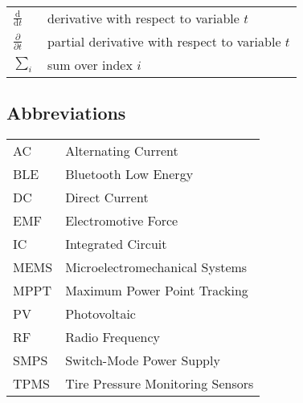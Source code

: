 \documentclass[english,12pt,a4paper,pdftex,elec,utf8]{aaltothesis}
\begin{document}
\begin{tabular}{ll}
$\displaystyle\frac{\mbox{d}}{\mbox{d} t}$ & derivative with respect to 
variable $t$\\[3mm]
$\displaystyle\frac{\partial}{\partial t}$  & partial derivative with respect 
to variable $t$ \\[3mm]
$\sum_i $                       & sum over index $i$
\end{tabular}

\subsection*{Abbreviations}

\begin{tabular}{ll}
AC         & Alternating Current \\
BLE        & Bluetooth Low Energy \\
DC         & Direct Current \\
EMF        & Electromotive Force \\
IC         & Integrated Circuit \\
MEMS       & Microelectromechanical Systems \\
MPPT       & Maximum Power Point Tracking \\
PV         & Photovoltaic \\
RF         & Radio Frequency \\
SMPS       & Switch-Mode Power Supply \\
TPMS       & Tire Pressure Monitoring Sensors
\end{tabular}


\cleardoublepage
\storeinipagenumber
{}
\setcounter{page}{1}



\end{document}
